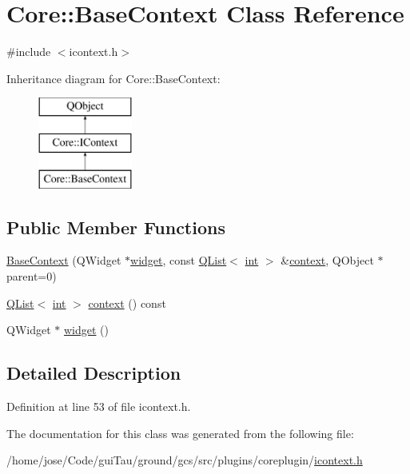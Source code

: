 \hypertarget{class_core_1_1_base_context}{\section{Core\-:\-:Base\-Context Class Reference}
\label{class_core_1_1_base_context}
}


{\ttfamily \#include $<$icontext.\-h$>$}

Inheritance diagram for Core\-:\-:Base\-Context\-:\begin{figure}[H]
\begin{center}
\leavevmode
\includegraphics[height=3.000000cm]{class_core_1_1_base_context}
\end{center}
\end{figure}
\subsection*{Public Member Functions}
\begin{DoxyCompactItemize}
\item 
\hyperlink{group___core_plugin_gac11e47d56487082f8fb09d4b700f5dfb}{Base\-Context} (Q\-Widget $\ast$\hyperlink{group___core_plugin_ga4aa83aa72d1e46f3c0011bac0b1ae9ca}{widget}, const \hyperlink{class_q_list}{Q\-List}$<$ \hyperlink{ioapi_8h_a787fa3cf048117ba7123753c1e74fcd6}{int} $>$ \&\hyperlink{group___core_plugin_ga955c8501de749dd5e235762cf13bc9fb}{context}, Q\-Object $\ast$parent=0)
\item 
\hyperlink{class_q_list}{Q\-List}$<$ \hyperlink{ioapi_8h_a787fa3cf048117ba7123753c1e74fcd6}{int} $>$ \hyperlink{group___core_plugin_ga955c8501de749dd5e235762cf13bc9fb}{context} () const 
\item 
Q\-Widget $\ast$ \hyperlink{group___core_plugin_ga4aa83aa72d1e46f3c0011bac0b1ae9ca}{widget} ()
\end{DoxyCompactItemize}


\subsection{Detailed Description}


Definition at line 53 of file icontext.\-h.



The documentation for this class was generated from the following file\-:\begin{DoxyCompactItemize}
\item 
/home/jose/\-Code/gui\-Tau/ground/gcs/src/plugins/coreplugin/\hyperlink{icontext_8h}{icontext.\-h}\end{DoxyCompactItemize}
